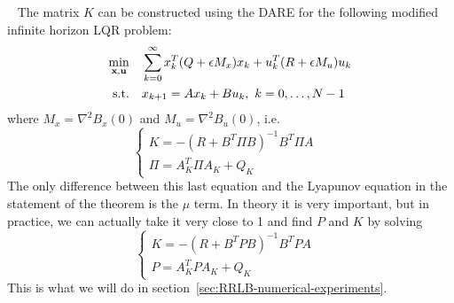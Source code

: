 \documentclass[12pt]{article}
\begin{document}
\begin{remark}~
	The matrix $K$ can be constructed using the DARE for the following modified infinite horizon LQR problem:
	\begin{align}
		\begin{split}\label{eq:inf-LQR}
			\underset{\bf{x},\bf{u}}{\min} &\quad \sum_{k=0}^\infty x_k^T(Q+\epsilon M_x)x_k+u_k^T(R+\epsilon M_u)u_k\\
			\text{s.t.} &\quad x_{k+1}=Ax_k+Bu_k,~k=0,\ldots,N-1\\
		\end{split}
	\end{align}
	where $M_x=\nabla^2B_x(0)$ and $M_u=\nabla^2B_u(0)$, i.e.
	$$\begin{cases}
		K=-(R+B^T\Pi B)^{-1}B^T\Pi A&\\
		\Pi=A_K^T\Pi A_K+Q_K
	\end{cases}$$
	The only difference between this last equation and the Lyapunov equation in the statement of the theorem is the $\mu$ term.
	In theory it is very important, but in practice, we can actually take it very close to 1 and find $P$ and $K$ by solving
	$$\begin{cases}
		K=-(R+B^TP B)^{-1}B^TP A&\\
		P=A_K^TP A_K+Q_K
	\end{cases}$$
	This is what we will do in section~\ref{sec:RRLB-numerical-experiments}.
\end{remark}
\end{document}
